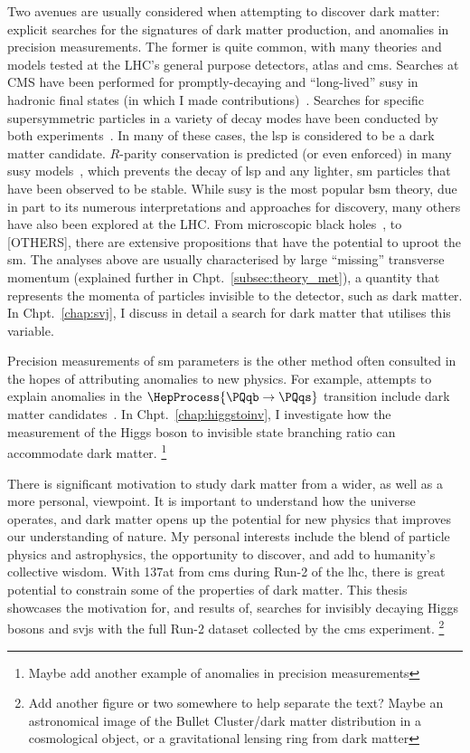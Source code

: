 Two avenues are usually considered when attempting to discover dark matter: explicit searches for the signatures of dark matter production, and anomalies in precision measurements. The former is quite common, with many theories and models tested at the LHC's general purpose detectors, \acrshort{atlas} and \acrshort{cms}. Searches at CMS have been performed for promptly-decaying and ``long-lived'' \acrlong{susy} in hadronic final states (in which I made contributions)~\cite{CMS-PAPER-SUS-15-005-published,SUS16038published}. Searches for specific supersymmetric particles in a variety of decay modes have been conducted by both experiments~\cite{CANEPA2019100033}. In many of these cases, the \acrfull{lsp} is considered to be a dark matter candidate. $R$-parity conservation is predicted (or even enforced) in many \acrshort{susy} models~\cite{Martin:1997ns}, which prevents the decay of \acrshort{lsp} and any lighter, \acrlong{sm} particles that have been observed to be stable. While \acrlong{susy} is the most popular \acrshort{bsm} theory, due in part to its numerous interpretations and approaches for discovery, many others have also been explored at the LHC. From microscopic black holes~\cite{Khachatryan:2010wx}, to [OTHERS], there are extensive propositions that have the potential to uproot the \acrlong{sm}. The analyses above are usually characterised by large ``missing'' transverse momentum (explained further in Chpt.~\ref{subsec:theory_met}), a quantity that represents the momenta of particles invisible to the detector, such as dark matter. In Chpt.~\ref{chap:svj}, I discuss in detail a search for dark matter that utilises this variable.

Precision measurements of \acrlong{sm} parameters is the other method often consulted in the hopes of attributing anomalies to new physics. For example, attempts to explain anomalies in the $\HepProcess{\Pqb \to \Pqs}$ transition include dark matter candidates~\cite{Vicente:2018xbv,another_b_s_anomaly_paper}. In Chpt.~\ref{chap:higgstoinv}, I investigate how the measurement of the Higgs boson to invisible state branching ratio can accommodate dark matter. \footnote{Maybe add another example of anomalies in precision measurements}

There is significant motivation to study dark matter from a wider, as well as a more personal, viewpoint. It is important to understand how the universe operates, and dark matter opens up the potential for new physics that improves our understanding of nature. My personal interests include the blend of particle physics and astrophysics, the opportunity to discover, and add to humanity's collective wisdom. With 137\fbinv at \comruntwo from \acrshort{cms} during Run-2 of the \acrshort{lhc}, there is great potential to constrain some of the properties of dark matter. This thesis showcases the motivation for, and results of, searches for invisibly decaying Higgs bosons and \glspl{svj} with the full Run-2 dataset collected by the \acrshort{cms} experiment. \footnote{Add another figure or two somewhere to help separate the text? Maybe an astronomical image of the Bullet Cluster/dark matter distribution in a cosmological object, or a gravitational lensing ring from dark matter}


